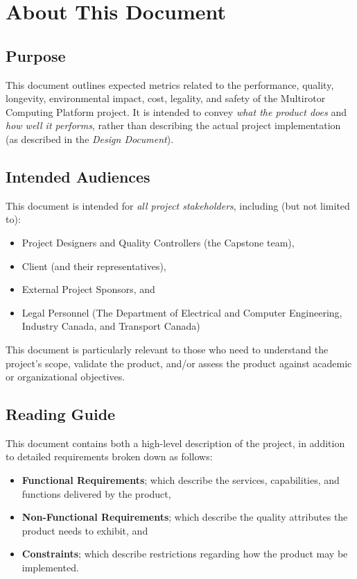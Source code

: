 \documentclass[10pt,letterpaper]{article}
\begin{document}


\section{About This Document}\label{section:about}
\subsection{Purpose}\label{section:about:purpose}
This document outlines expected metrics related to the performance, quality, longevity, environmental impact, cost, legality, and safety of the Multirotor Computing Platform project. It is intended to convey \textit{what the product does} and \textit{how well it performs}, rather than describing the actual project implementation (as described in the \textit{Design Document}).

\subsection{Intended Audiences}\label{section:about:audience}
This document is intended for \textit{all project stakeholders}, including (but not limited to):
\begin{itemize}
\item Project Designers and Quality Controllers (the Capstone team), 
\item Client (and their representatives), 
\item External Project Sponsors, and
\item Legal Personnel (The Department of Electrical and Computer Engineering, Industry Canada, and Transport Canada)
\end{itemize}

This document is particularly relevant to those who need to understand the project's scope, validate the product, and/or assess the product against academic or organizational objectives.

\subsection{Reading Guide}\label{section:about:readingguide}
This document contains both a high-level description of the project, in addition to detailed requirements broken down as follows:

\begin{itemize}
\item \textbf{Functional Requirements}; which describe the services, capabilities, and functions delivered by the product, 
\item \textbf{Non-Functional Requirements}; which describe the quality attributes the product needs to exhibit, and  
\item \textbf{Constraints}; which describe restrictions regarding how the product may be implemented.
\end{itemize}
\end{document}
